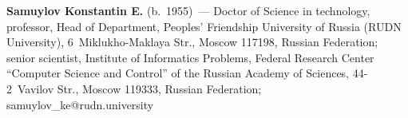\vspace*{3pt}

\noindent
\textbf{Samuylov Konstantin E.} (b.\ 1955)~--- Doctor of Science in technology, 
professor, Head of Department, Peoples' Friendship University of Russia 
(RUDN University), 6~Miklukho-Maklaya Str., 
Moscow 117198, Russian Federation; senior scientist, 
Institute of Informatics Problems, Federal Research Center 
``Computer Science and Control'' of the Russian Academy of Sciences, 
44-2~Vavilov Str., Moscow 119333, Russian Federation; 
\mbox{samuylov\_ke@rudn.university}

\label{end\stat}

\renewcommand{\bibname}{\protect\rm Литература}       